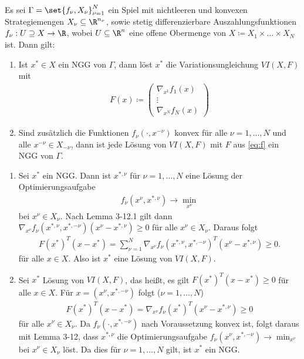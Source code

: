   \begin{satz}
    Es sei $\Gamma = \set{f_{\nu}, X_{\nu}}_{\nu = 1}^{N}$ ein Spiel mit nichtleeren und konvexen Strategiemengen $X_{\nu} \subseteq \R^{n_{\nu}}$, sowie stetig differenzierbare Auszahlungsfunktionen $f_{\nu}: U \supseteq X \to \R$, wobei $U \subseteq \R^{n}$ eine offene Obermenge von $X\coloneqq X_{1}\times \dots \times X_{N}$ ist. Dann gilt:
    \begin{enumerate}
    \item Ist $x^{*} \in X$ ein NGG von $\Gamma$, dann löst $x^{*}$ die Variationsungleichung $VI(X, F)$ mit
      \begin{align}\label{eq:f}
        F(x) \coloneqq
        \begin{pmatrix}
          \nabla_{x^{1}} f_{1}(x)\\
          \vdots\\
          \nabla_{x^{N}} f_{N}(x)
        \end{pmatrix}
      \end{align}
      \item Sind zusätzlich die Funktionen $f_{\nu}(\cdot, x^{-\nu})$ konvex für alle $\nu = 1, \dots, N$ und alle $x^{-\nu} \in X_{-\nu}$, dann ist jede Lösung von $VI(X, F)$ mit $F$ aus \eqref{eq:f} ein NGG von $\Gamma$. 
    \end{enumerate}
  \end{satz}
  \begin{beweis}
    \begin{enumerate}
    \item Sei $x^{*}$ ein NGG. Dann ist $x^{*, \nu}$ für $\nu = 1, \dots, N$ eine Lösung der Optimierungsaufgabe
      \begin{align*}
        f_{\nu}(x^{\nu}, x^{*, \nu}) \to \min_{x^{\nu}}
      \end{align*}
bei $x^{\nu} \in X_{\nu}$. Nach Lemma 3-12.1 gilt dann $\nabla_{x^{\nu}}f_{\nu}(x^{*, \nu}, x^{*, -\nu}) (x^{\nu} - x^{*, \nu}) \geq 0$
für alle $x^{\nu} \in X_{\nu}$. Daraus folgt
\begin{align*}
  F(x^{*})^{T} (x - x^{*}) = \sum_{\nu = 1}^{N} \nabla_{x^{\nu}}f_{\nu}(x^{*, \nu}, x^{*, -\nu})^{T}(x^{\nu} - x^{*, \nu}) \geq 0. 
\end{align*}
für alle $x \in X$. Also ist $x^{*}$ eine Lösung von $VI(X, F)$. 
\item Sei $x^{*}$ Lösung von $VI(X, F)$, das heißt, es gilt $F(x^{*})^{T} (x - x^{*}) \geq 0$ für alle $x \in X$. Für $x = (x^{\nu}, x^{*, -\nu})$ folgt ($\nu =1, \dots, N$)
  \begin{align*}
    F(x^{*})^{T}(x - x^{*}) = \nabla_{x^{\nu}}f_{\nu}(x^{*})^{T}(x^{\nu} - x^{*, \nu}) \geq 0
  \end{align*}
  für alle $x^{\nu} \in X_{\nu}$. Da $f_{\nu}(\cdot, x^{*, -\nu})$ nach Voraussetzung konvex ist, folgt daraus mit Lemma 3-12, dass $x^{*, \nu}$ die Optimierungsaufgabe $f_{\nu} (x^{\nu}, x^{*, - \nu}) \to \min_{x^{\nu}}$ bei $x^{\nu} \in X_{\nu}$ löst. Da dies für $\nu = 1, \dots, N$ gilt, ist $x^{*}$ ein NGG. 
\end{enumerate}    
\end{beweis}

